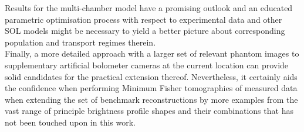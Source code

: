     Results for the multi-chamber model have a promising outlook and an educated parametric optimisation process with respect to experimental data and other SOL models might be necessary to yield a better picture about corresponding population and transport regimes therein.\\%
    Finally, a more detailed approach with a larger set of relevant phantom images to supplementary artificial bolometer cameras at the current location can provide solid candidates for the practical extension thereof. Nevertheless, it certainly aids the confidence when performing Minimum Fisher tomographies of measured data when extending the set of benchmark reconstructions by more examples from the vast range of principle brightness profile shapes and their combinations that has not been touched upon in this work.%

